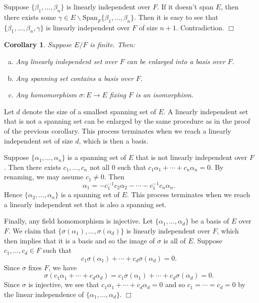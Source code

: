 \documentclass{article}
\newtheorem{cor}[subsection]{Corollary}
\newenvironment{proof}{\noindent {\bf Proof:}}{$\Box$ \vspace{2 ex}}
\begin{document}
\begin{proof}
    Suppose $\{\beta_1,\ldots,\beta_n\}$ is linearly independent over $F$. If it doesn't span $E$, then there exists some $\gamma\in E\backslash\text{Span}_F\{\beta_1,\ldots,\beta_n\}.$ Then it is easy to see that $\{\beta_1,\ldots,\beta_n,\gamma\}$ is linearly independent over $F$ of size $n+1$. Contradiction.
\end{proof}

\begin{cor}
    Suppose $E/F$ is finite. Then:
    \begin{enumerate}[(a)]
        \item Any linearly independent set over $F$ can be enlarged into a basis over $F$.
        \item Any spanning set contains a basis over $F$.
        \item Any homomorphism $\sigma:E\rightarrow E$ fixing $F$ is an isomorphism.
    \end{enumerate}
\end{cor}

\begin{proof}
    Let $d$ denote the size of a smallest spanning set of $E$.
    A linearly independent set that is not a spanning set can be enlarged by the same procedure as in the proof of the previous corollary. This process terminates when we reach a linearly independent set of size $d$, which is then a basis.

    Suppose $\{\alpha_1,\ldots,\alpha_n\}$ is a spanning set of $E$ that is not linearly independent over $F$. Then there exists $c_1,\ldots,c_n$ not all $0$ such that $c_1\alpha_1 + \cdots + c_n\alpha_n = 0$. By renaming, we may assume $c_1\neq 0$. Then $$\alpha_1 = -c_1^{-1}c_2\alpha_2 - \cdots - c_1^{-1}c_n\alpha_n.$$
    Hence $\{\alpha_2,\ldots,\alpha_n\}$ is a spanning set of $E$. This process terminates when we reach a linearly independent set that is also a spanning set.

    Finally, any field homomorphism is injective. Let $\{\alpha_1,\ldots,\alpha_d\}$ be a basis of $E$ over $F$. We claim that $\{\sigma(\alpha_1),\ldots,\sigma(\alpha_d)\}$ is linearly independent over $F$, which then implies that it is a basis and so the image of $\sigma$ is all of $E$. Suppose $c_1,\ldots,c_d\in F$ such that $$c_1\sigma(\alpha_1) + \cdots + c_d\sigma(\alpha_d) = 0.$$
    Since $\sigma$ fixes $F$, we have
    $$\sigma(c_1\alpha_1 + \cdots + c_d\alpha_d) = c_1\sigma(\alpha_1) + \cdots + c_d\sigma(\alpha_d) = 0.$$
    Since $\sigma$ is injective, we see that $c_1\alpha_1 + \cdots + c_d\alpha_d = 0$ and so $c_1 = \cdots = c_d = 0$ by the linear independence of $\{\alpha_1,\ldots,\alpha_d\}$.
\end{proof}
\end{document}
